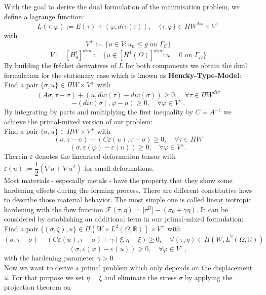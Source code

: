 \documentclass{article}
\begin{document}
With the goal to derive the dual formulation of the minimisation problem, we define a lagrange function:
$$L(\tau,\varphi) := E(\tau) + (\varphi, div(\tau)),\quad \lbrace\tau,\varphi\rbrace\in\Pi W^{div}\times V^+$$
with
$$V^+ := \lbrace u\in V: u_n\leq g \text{ on } \Gamma_C \rbrace$$
$$V:=\left[ H_0^1 \right]^{dim}:=\lbrace u\in \left[H^1(\Omega)\right]^{dim}: u
= 0 \text{ on } \Gamma_D\rbrace$$
By building the fr\'echet derivatives of $L$ for both components we obtain the dual formulation for the stationary case
which is known as \textbf{Hencky-Type-Model}:\\
Find a pair $\lbrace\sigma,u\rbrace\in \Pi W\times V^+$ with
$$\left(A\sigma,\tau - \sigma\right) + \left(u, div(\tau) - div(\sigma)\right) \geq 0,\quad \forall \tau\in \Pi W^{div}$$
$$-\left(div(\sigma),\varphi - u\right) \geq 0,\quad \forall \varphi\in V^+.$$
By integrating by parts and multiplying the first inequality by $C=A^{-1}$  we achieve the primal-mixed version of our problem:\\
Find a pair $\lbrace\sigma,u\rbrace\in \Pi W\times V^+$ with
$$\left(\sigma,\tau - \sigma\right) - \left(C\varepsilon(u), \tau - \sigma\right) \geq 0,\quad \forall \tau\in \Pi W$$
$$\left(\sigma,\varepsilon(\varphi) - \varepsilon(u)\right) \geq 0,\quad \forall \varphi\in V^+.$$
Therein $\varepsilon$ denotes the linearised deformation tensor with $\varepsilon(u) := \dfrac{1}{2}\left(\nabla u + \nabla u^T\right)$ for small deformations.\\
Most materials - especially metals - have the property that they show some hardening effects during the forming process.
There are different constitutive laws to describe those material behavior. The most simple one is called linear isotropic hardening
with the flow function $\mathcal{F}(\tau,\eta) = \vert\tau^D\vert - (\sigma_0 + \gamma\eta)$.
It can be considered by establishing an additional term in our primal-mixed formulation:\\
Find a pair $\lbrace(\sigma,\xi),u\rbrace\in \Pi (W\times L^2(\Omega,\mathbb{R}))\times V^+$ with
$$\left(\sigma,\tau - \sigma\right) - \left(C\varepsilon(u), \tau - \sigma\right) + \gamma\left( \xi, \eta - \xi\right) \geq 0,\quad \forall (\tau,\eta)\in \Pi (W,L^2(\Omega,\mathbb{R}))$$
$$\left(\sigma,\varepsilon(\varphi) - \varepsilon(u)\right) \geq 0,\quad \forall \varphi\in V^+,$$
with the hardening parameter $\gamma > 0$.\\
Now we want to derive a primal problem which only depends on the displacement $u$. For that purpose we
set $\eta = \xi$ and eliminate the stress $\sigma$ by applying the projection theorem on\\
\end{document}
